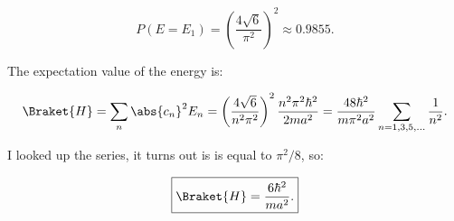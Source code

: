 \begin{parts}
\begin{equation*}
    P(E = E_1) = \left( \frac{4\sqrt{6}}{\pi^2} \right)^2 \approx \boxed{0.9855.}
\end{equation*}




\item The expectation value of the energy is:

\begin{equation}
    \Braket{H} = \sum_n \abs{c_n}^2 E_n = \left( \frac{4\sqrt{6}}{n^2\pi^2} \right)^2 \frac{n^2\pi^2\hbar^2}{2ma^2} = \frac{48\hbar^2}{m\pi^2a^2} \sum_{n=1,3,5,\ldots} \frac{1}{n^2}.
\end{equation}

I looked up the series, it turns out is is equal to $\pi^2/8$, so:

\begin{equation*}
    \boxed{\Braket{H} = \frac{6\hbar^2}{ma^2}.}
\end{equation*}




\end{parts}
